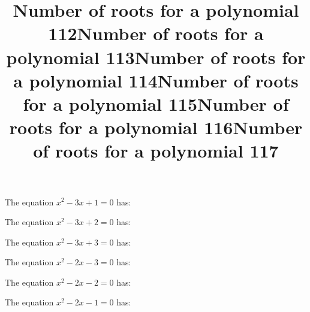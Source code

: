 \documentclass{article}
\begin{document}
\begin{category}
\begin{question}[multichoice]


\end{question}
\begin{question}[multichoice]
\title{Number of roots for a polynomial 112}
The equation $x^{2} - 3 x + 1=0$ has:



\end{question}
\begin{question}[multichoice]
\title{Number of roots for a polynomial 113}
The equation $x^{2} - 3 x + 2=0$ has:



\end{question}
\begin{question}[multichoice]
\title{Number of roots for a polynomial 114}
The equation $x^{2} - 3 x + 3=0$ has:



\end{question}
\begin{question}[multichoice]
\title{Number of roots for a polynomial 115}
The equation $x^{2} - 2 x - 3=0$ has:



\end{question}
\begin{question}[multichoice]
\title{Number of roots for a polynomial 116}
The equation $x^{2} - 2 x - 2=0$ has:



\end{question}
\begin{question}[multichoice]
\title{Number of roots for a polynomial 117}
The equation $x^{2} - 2 x - 1=0$ has:




\end{question}
\end{category}
\end{document}
